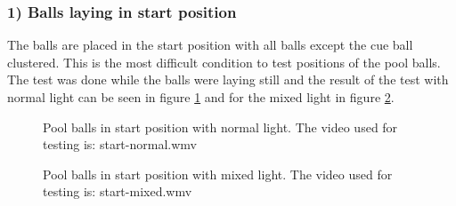 \subsubsection{ 1) Balls laying in start position}
The balls are placed in the start position with all balls except the cue ball clustered. This is the most difficult condition to test positions of the pool balls. The test was done while the balls were laying still and the result of the test with normal light can be seen in figure \ref{fig:poolposstart} and for the mixed light in figure \ref{fig:poolposstart2}.

\begin{figure}[H]
  \centering
\quad
   \caption{Pool balls in start position with normal light. The video used for testing is: start-normal.wmv}
  \label{fig:poolposstart}
\end{figure}


\begin{figure}[H]
  \centering
\quad
\quad
   \caption{Pool balls in start position with mixed light. The video used for testing is: start-mixed.wmv}
  \label{fig:poolposstart2}
\end{figure}

